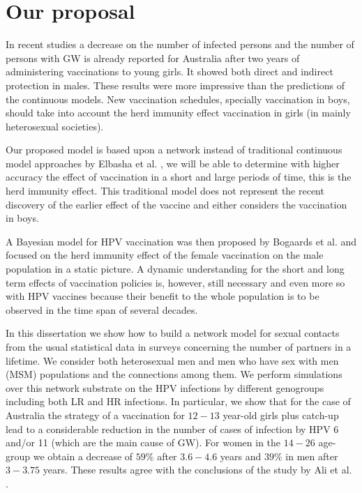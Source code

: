 \section{Our proposal}

In recent studies \cite{fairley2009rapid,ali2013genital} a decrease on the number of infected persons and the number of persons with GW is already reported for Australia after two years of administering vaccinations to young girls. It showed both direct and indirect protection in males. These results were more impressive than the predictions of the continuous models. New vaccination schedules, specially vaccination in boys, should take into account the herd immunity effect vaccination in girls (in mainly heterosexual societies). 

Our proposed model is based upon a network instead of traditional continuous model approaches by Elbasha et al. \cite{elbasha2007model}, we will be able to determine with higher accuracy the effect of vaccination in a short and large periods of time, this is the herd immunity effect. This traditional model does not represent the recent discovery of the earlier effect of the vaccine and either considers the vaccination in boys.

A Bayesian model for HPV vaccination was then proposed by Bogaards et al. \cite{bogaards2015direct} and focused on the herd immunity effect of the female vaccination on the male population in a static picture. A dynamic understanding for the short and long term effects of vaccination policies is, however, still necessary and even more so with HPV vaccines because their benefit to the whole population is to be observed in the time span of several decades.

In this dissertation we show how to build a network model for sexual contacts from the usual statistical data in surveys concerning the number of partners in a lifetime. We consider both heterosexual men and men who have sex with men (MSM) populations and the connections among them. We perform simulations over this network substrate on the HPV infections by different genogroups including both LR and HR infections. In particular, we show that for the case of Australia the strategy of a vaccination for $12-13$ year-old girls plus catch-up lead to a considerable reduction in the number of cases of infection by HPV 6 and/or 11 (which are the main cause of GW). For women in the $14-26$ age-group we obtain a decrease of $59\%$ after $3.6-4.6$ years and $39\%$ in men after $3-3.75$ years. These results agree with the conclusions of the study by Ali et al. \cite{ali2013genital}.

